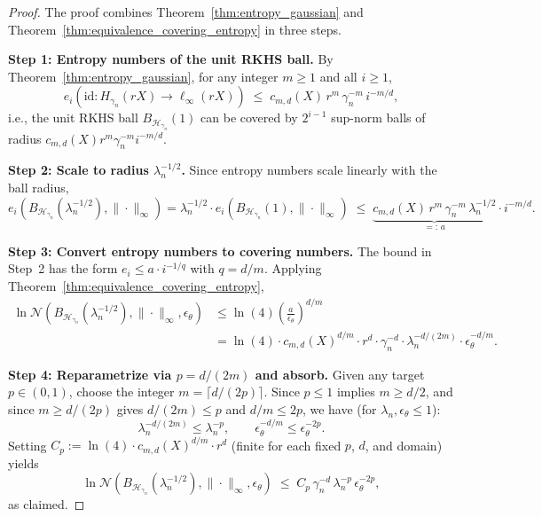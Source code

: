 \documentclass[12pt]{article}
\begin{document}
\begin{proof}
The proof combines Theorem~\ref{thm:entropy_gaussian} and Theorem~\ref{thm:equivalence_covering_entropy} in three steps.

\noindent\textbf{Step 1: Entropy numbers of the unit RKHS ball.}
By Theorem~\ref{thm:entropy_gaussian}, for any integer $m\geq 1$ and all $i\geq 1$,
\[
e_i\!\left(\mathrm{id}:H_{\gamma_n}(rX)\to\ell_\infty(rX)\right)
\;\leq\; c_{m,d}(X)\,r^m\,\gamma_n^{-m}\,i^{-m/d},
\]
i.e., the unit RKHS ball $B_{\mathcal{H}_{\gamma_n}}(1)$ can be covered by $2^{i-1}$ sup-norm balls of radius $c_{m,d}(X)r^m\gamma_n^{-m}i^{-m/d}$.

\noindent\textbf{Step 2: Scale to radius $\lambda_n^{-1/2}$.}
Since entropy numbers scale linearly with the ball radius,
\[
e_i\!\left(B_{\mathcal{H}_{\gamma_n}}(\lambda_n^{-1/2}),\|\cdot\|_\infty\right)
= \lambda_n^{-1/2}\cdot e_i\!\left(B_{\mathcal{H}_{\gamma_n}}(1),\|\cdot\|_\infty\right)
\;\leq\; \underbrace{c_{m,d}(X)\,r^m\,\gamma_n^{-m}\,\lambda_n^{-1/2}}_{=:\,a}\cdot i^{-m/d}.
\]

\noindent\textbf{Step 3: Convert entropy numbers to covering numbers.}
The bound in Step~2 has the form $e_i\leq a\cdot i^{-1/q}$ with $q=d/m$. Applying Theorem~\ref{thm:equivalence_covering_entropy},
\begin{align*}
\ln\mathcal{N}\!\left(B_{\mathcal{H}_{\gamma_n}}(\lambda_n^{-1/2}),\|\cdot\|_\infty,\epsilon_\theta\right)
&\leq \ln(4)\left(\frac{a}{\epsilon_\theta}\right)^{d/m}\\
&= \ln(4)\cdot c_{m,d}(X)^{d/m}\cdot r^d\cdot\gamma_n^{-d}\cdot\lambda_n^{-d/(2m)}\cdot\epsilon_\theta^{-d/m}.
\end{align*}

\noindent\textbf{Step 4: Reparametrize via $p=d/(2m)$ and absorb.}
Given any target $p\in(0,1)$, choose the integer $m=\lceil d/(2p)\rceil$. Since $p\leq 1$ implies $m\geq d/2$, and since $m\geq d/(2p)$ gives $d/(2m)\leq p$ and $d/m\leq 2p$, we have (for $\lambda_n,\epsilon_\theta\leq 1$):
\[
\lambda_n^{-d/(2m)}\leq\lambda_n^{-p}, \qquad \epsilon_\theta^{-d/m}\leq\epsilon_\theta^{-2p}.
\]
Setting $C_p:=\ln(4)\cdot c_{m,d}(X)^{d/m}\cdot r^d$ (finite for each fixed $p$, $d$, and domain) yields
\[
\ln\mathcal{N}\!\left(B_{\mathcal{H}_{\gamma_n}}(\lambda_n^{-1/2}),\|\cdot\|_\infty,\epsilon_\theta\right)
\;\leq\; C_p\,\gamma_n^{-d}\,\lambda_n^{-p}\,\epsilon_\theta^{-2p},
\]
as claimed.
\end{proof}
\end{document}
